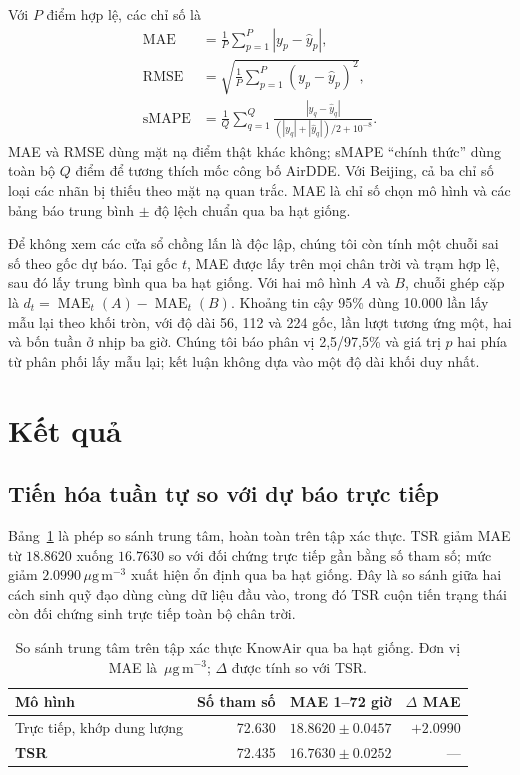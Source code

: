 \documentclass[10pt,a4paper]{article}
\newcommand{\unitpm}{\,\mu\mathrm{g}\,\mathrm{m}^{-3}}
\newcommand{\modelname}{TSR}
\DeclareMathOperator{\MAE}{MAE}
\DeclareMathOperator{\RMSE}{RMSE}
\DeclareMathOperator{\sMAPE}{sMAPE}
\begin{document}
Với $P$ điểm hợp lệ, các chỉ số là
\begin{align}
  \MAE &= \frac{1}{P}\sum_{p=1}^{P}|y_p-\widehat{y}_p|,\\
  \RMSE &= \sqrt{\frac{1}{P}\sum_{p=1}^{P}(y_p-\widehat{y}_p)^2},\\
  \sMAPE &= \frac{1}{Q}\sum_{q=1}^{Q}
  \frac{|y_q-\widehat{y}_q|}{(|y_q|+|\widehat{y}_q|)/2+10^{-8}}.
\end{align}
MAE và RMSE dùng mặt nạ điểm thật khác không; sMAPE ``chính thức'' dùng toàn bộ $Q$ điểm để tương thích mốc công bố AirDDE. Với Beijing, cả ba chỉ số loại các nhãn bị thiếu theo mặt nạ quan trắc. MAE là chỉ số chọn mô hình và các bảng báo trung bình $\pm$ độ lệch chuẩn qua ba hạt giống.

Để không xem các cửa sổ chồng lấn là độc lập, chúng tôi còn tính một chuỗi sai số theo gốc dự báo. Tại gốc $t$, MAE được lấy trên mọi chân trời và trạm hợp lệ, sau đó lấy trung bình qua ba hạt giống. Với hai mô hình $A$ và $B$, chuỗi ghép cặp là $d_t=\MAE_t(A)-\MAE_t(B)$. Khoảng tin cậy 95\% dùng 10.000 lần lấy mẫu lại theo khối tròn, với độ dài 56, 112 và 224 gốc, lần lượt tương ứng một, hai và bốn tuần ở nhịp ba giờ. Chúng tôi báo phân vị 2,5/97,5\% và giá trị $p$ hai phía từ phân phối lấy mẫu lại; kết luận không dựa vào một độ dài khối duy nhất.

\section{Kết quả}

\subsection{Tiến hóa tuần tự so với dự báo trực tiếp}

Bảng~\ref{tab:main-validation} là phép so sánh trung tâm, hoàn toàn trên tập xác thực. \modelname{} giảm MAE từ $18.8620$ xuống $16.7630$ so với đối chứng trực tiếp gần bằng số tham số; mức giảm $2.0990\unitpm$ xuất hiện ổn định qua ba hạt giống. Đây là so sánh giữa hai cách sinh quỹ đạo dùng cùng dữ liệu đầu vào, trong đó \modelname{} cuộn tiến trạng thái còn đối chứng sinh trực tiếp toàn bộ chân trời.

\begin{table}[t]
  \centering
  \caption{So sánh trung tâm trên tập xác thực KnowAir qua ba hạt giống. Đơn vị MAE là $\unitpm$; $\Delta$ được tính so với \modelname{}.}
  \label{tab:main-validation}
  \begin{threeparttable}
  \begin{tabular}{@{}lrrr@{}}
    \toprule
    Mô hình & Số tham số & MAE 1--72 giờ & $\Delta$ MAE \\
    \midrule
    Trực tiếp, khớp dung lượng & 72.630 & $18.8620\pm0.0457$ & $+2.0990$ \\
    \textbf{\modelname{}} & 72.435 & $\mathbf{16.7630\pm0.0252}$ & --- \\
    \bottomrule
  \end{tabular}
  \end{threeparttable}
\end{table}
\end{document}
